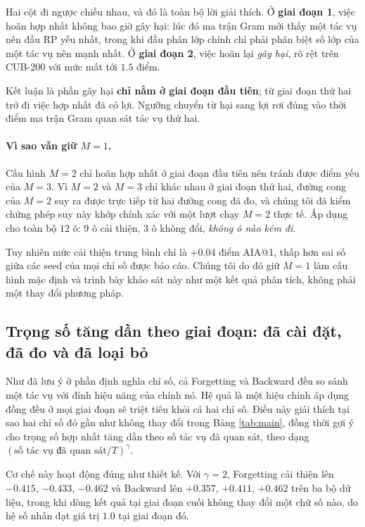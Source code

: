 \documentclass[11pt,a4paper]{article}
\begin{document}
Hai cột đi ngược chiều nhau, và đó là toàn bộ lời giải thích. Ở \textbf{giai
đoạn 1}, việc hoãn hợp nhất không bao giờ gây hại: lúc đó ma trận Gram mới thấy
một tác vụ nên đầu RP yếu nhất, trong khi đầu phân lớp chính chỉ phải phân biệt
số lớp của một tác vụ nên mạnh nhất. Ở \textbf{giai đoạn 2}, việc hoãn lại
\emph{gây hại}, rõ rệt trên CUB-200 với mức mất tới $1.5$ điểm.

Kết luận là phần gây hại \textbf{chỉ nằm ở giai đoạn đầu tiên}; từ giai đoạn thứ
hai trở đi việc hợp nhất đã có lợi. Ngưỡng chuyển từ hại sang lợi rơi đúng vào
thời điểm ma trận Gram quan sát tác vụ thứ hai.

\paragraph{Vì sao vẫn giữ $M = 1$.}
Cấu hình $M = 2$ chỉ hoãn hợp nhất ở giai đoạn đầu tiên nên tránh được điểm yếu
của $M = 3$. Vì $M = 2$ và $M = 3$ chỉ khác nhau ở giai đoạn thứ hai, đường cong
của $M = 2$ suy ra được trực tiếp từ hai đường cong đã đo, và chúng tôi đã kiểm
chứng phép suy này khớp chính xác với một lượt chạy $M = 2$ thực tế. Áp dụng cho
toàn bộ $12$ ô: $9$ ô cải thiện, $3$ ô không đổi, \emph{không ô nào kém đi}.

Tuy nhiên mức cải thiện trung bình chỉ là $+0.04$ điểm AIA@1, thấp hơn sai số
giữa các seed của mọi chỉ số được báo cáo. Chúng tôi do đó giữ $M = 1$ làm cấu
hình mặc định và trình bày khảo sát này như một kết quả phân tích, không phải
một thay đổi phương pháp.

\subsection{Trọng số tăng dần theo giai đoạn: đã cài đặt, đã đo và đã loại bỏ}
\label{sec:ramp}

Như đã lưu ý ở phần định nghĩa chỉ số, cả Forgetting và Backward đều so sánh một
tác vụ với đỉnh hiệu năng của chính nó. Hệ quả là một hiệu chỉnh áp dụng đồng
đều ở mọi giai đoạn sẽ triệt tiêu khỏi cả hai chỉ số. Điều này giải thích tại
sao hai chỉ số đó gần như không thay đổi trong Bảng \ref{tab:main}, đồng thời
gợi ý cho trọng số hợp nhất tăng dần theo số tác vụ đã quan sát, theo dạng
$(\text{số tác vụ đã quan sát}/T)^{\gamma}$.

Cơ chế này hoạt động đúng như thiết kế. Với $\gamma = 2$, Forgetting cải thiện
lên $-0.415$, $-0.433$, $-0.462$ và Backward lên $+0.357$, $+0.411$, $+0.462$
trên ba bộ dữ liệu, trong khi dòng kết quả tại giai đoạn cuối không thay đổi một
chữ số nào, do hệ số nhân đạt giá trị $1.0$ tại giai đoạn đó.
\end{document}
